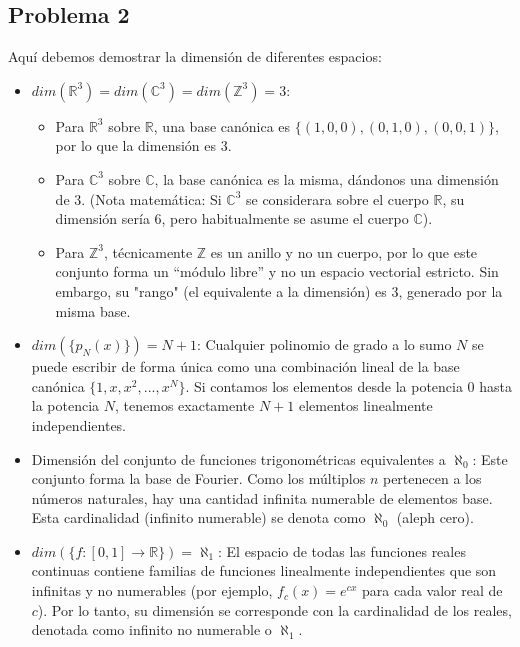 \documentclass[11pt,spanish]{article}
\begin{document}
\subsection*{Problema 2}

Aquí debemos demostrar la dimensión de diferentes espacios:

\begin{itemize}
\item[a)] $dim(\mathbb{R}^{3})=dim(\mathbb{C}^{3})=dim(\mathbb{Z}^{3})=3$:

\begin{itemize}
\item Para $\mathbb{R}^{3}$ sobre $\mathbb{R}$, una base canónica es $\{(1,0,0), (0,1,0), (0,0,1)\}$, por lo que la dimensión es 3.
\item Para $\mathbb{C}^{3}$ sobre $\mathbb{C}$, la base canónica es la misma, dándonos una dimensión de 3. (Nota matemática: Si $\mathbb{C}^{3}$ se considerara sobre el cuerpo $\mathbb{R}$, su dimensión sería 6, pero habitualmente se asume el cuerpo $\mathbb{C}$).
\item Para $\mathbb{Z}^{3}$, técnicamente $\mathbb{Z}$ es un anillo y no un cuerpo, por lo que este conjunto forma un ``módulo libre'' y no un espacio vectorial estricto. Sin embargo, su "rango" (el equivalente a la dimensión) es 3, generado por la misma base.
\end{itemize}

\item[b)] $dim(\{p_{N}(x)\})=N+1$:
Cualquier polinomio de grado a lo sumo $N$ se puede escribir de forma única como una combinación lineal de la base canónica $\{1, x, x^{2}, ..., x^{N}\}$. Si contamos los elementos desde la potencia 0 hasta la potencia $N$, tenemos exactamente $N+1$ elementos linealmente independientes.

\item[c)] Dimensión del conjunto de funciones trigonométricas equivalentes a $\aleph_{0}$:
Este conjunto forma la base de Fourier. Como los múltiplos $n$ pertenecen a los números naturales, hay una cantidad infinita numerable de elementos base. Esta cardinalidad (infinito numerable) se denota como $\aleph_{0}$ (aleph cero).

\item[d)] $dim(\{f:[0,1]\rightarrow\mathbb{R}\})=\aleph_{1}$:
El espacio de todas las funciones reales continuas contiene familias de funciones linealmente independientes que son infinitas y no numerables (por ejemplo, $f_{c}(x) = e^{cx}$ para cada valor real de $c$). Por lo tanto, su dimensión se corresponde con la cardinalidad de los reales, denotada como infinito no numerable o $\aleph_{1}$.
\end{itemize} 
\end{document}
